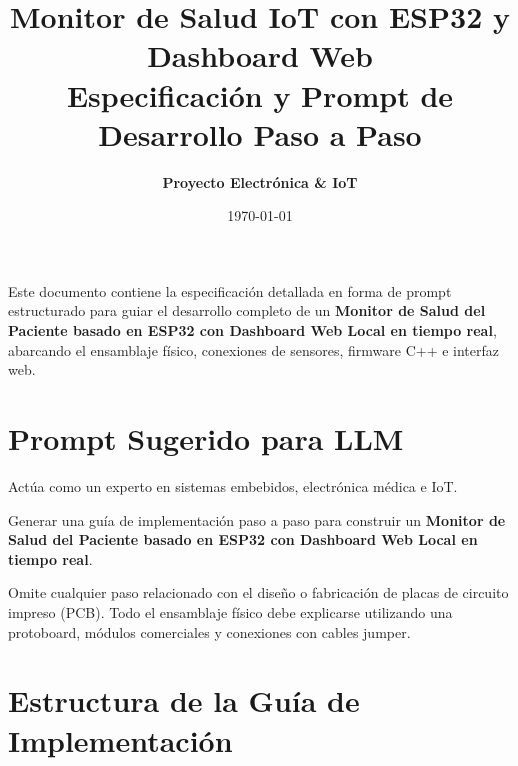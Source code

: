 \documentclass[11pt,a4paper]{article}
\title{\textbf{\Large Monitor de Salud IoT con ESP32 y Dashboard Web}\\[4pt]
\large Especificación y Prompt de Desarrollo Paso a Paso}
\author{\textbf{Proyecto Electrónica \& IoT}}
\date{\today}
\begin{document}
\maketitle

\begin{tcolorbox}[colback=azulClaro, colframe=azulOscuro, title=\textbf{Descripción del Modelo / Prompt}, arc=2mm, fonttitle=\bfseries]
Este documento contiene la especificación detallada en forma de prompt estructurado para guiar el desarrollo completo de un \textbf{Monitor de Salud del Paciente basado en ESP32 con Dashboard Web Local en tiempo real}, abarcando el ensamblaje físico, conexiones de sensores, firmware C++ e interfaz web.
\end{tcolorbox}

\vspace{0.3cm}

\section*{Prompt Sugerido para LLM}

\begin{description}[style=nextline, leftmargin=1cm]
    \item[\textbf{Rol:}] Actúa como un experto en sistemas embebidos, electrónica médica e IoT.
    
    \item[\textbf{Objetivo:}] Generar una guía de implementación paso a paso para construir un \textbf{Monitor de Salud del Paciente basado en ESP32 con Dashboard Web Local en tiempo real}.
    
    \item[\textbf{Restricción importante:}] Omite cualquier paso relacionado con el diseño o fabricación de placas de circuito impreso (PCB). Todo el ensamblaje físico debe explicarse utilizando una protoboard, módulos comerciales y conexiones con cables jumper.
\end{description}

\hrulefill

\vspace{0.3cm}

\section*{Estructura de la Guía de Implementación}
\end{document}
